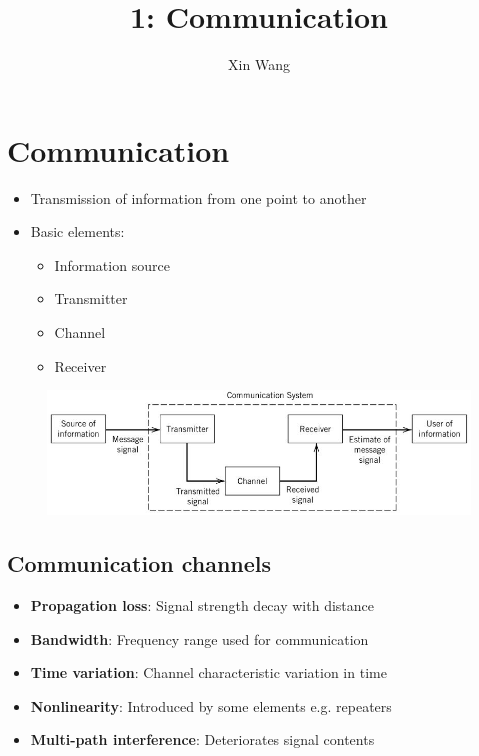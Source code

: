 \documentclass[conference]{IEEEtran}
\begin{document}
\title{1: Communication}
\author{Xin Wang}
\maketitle
\section{Communication}
\begin{itemize}
  \item Transmission of information from one point to another
  \item Basic elements:
  \begin{itemize}
      \item Information source
      \item Transmitter
      \item Channel
      \item Receiver
  \end{itemize}
\end{itemize}

\begin{figure} [h!]
    \centering
    \includegraphics[scale=0.5]{1.JPG}
\end{figure}

\subsection{Communication channels}

\begin{itemize}
    \item \textbf{Propagation loss}: Signal strength decay with distance
    \item \textbf{Bandwidth}: Frequency range used for communication 
    \item \textbf{Time variation}: Channel characteristic variation in time 
    \item \textbf{Nonlinearity}: Introduced by some elements e.g. repeaters 
    \item \textbf{Multi-path interference}: Deteriorates signal contents 
\end{itemize}
\end{document}
